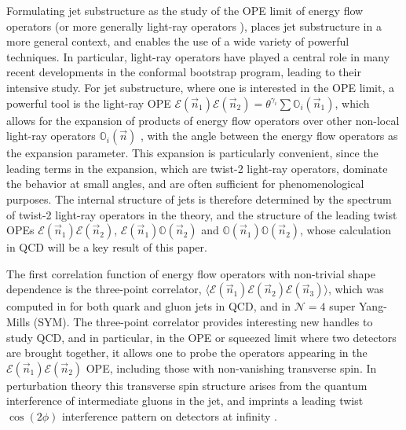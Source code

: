 \documentclass[letterpaper,11pt]{article}
\def\cN{\mathcal{N}}
\begin{document}
Formulating jet substructure as the study of the OPE limit of energy flow operators (or more generally light-ray operators \cite{Kravchuk:2018htv}), places jet substructure in a more general context, and enables the use of a wide variety of powerful techniques. In particular, light-ray operators have played a central role in many recent developments in the conformal bootstrap program, leading to their intensive study. For jet substructure, where one is interested in the OPE limit, a powerful tool is the light-ray OPE \cite{Hofman:2008ar,Kravchuk:2018htv,Kologlu:2019bco,Kologlu:2019mfz,1822249} $\mathcal{E}(\vec n_1) \mathcal{E}(\vec n_2)=\theta^{\gamma_i} \sum\mathbb{O}_i(\vec n_1)$, which allows for the expansion of products of energy flow operators over other non-local light-ray operators $\mathbb{O}_i(\vec n)$ \cite{Balitsky:1987bk,Balitsky:1988fi,Balitsky:1990ck,Braun:2003rp,Hofman:2008ar,Kravchuk:2018htv}, with the angle between the energy flow operators as the expansion parameter. This expansion is particularly convenient, since the leading terms in the expansion, which are twist-2 light-ray operators, dominate the  behavior at small angles, and are often sufficient for phenomenological purposes. The internal structure of jets is therefore determined by the spectrum of twist-2 light-ray operators in the theory, and the structure of the leading twist OPEs $\mathcal{E}(\vec n_1) \mathcal{E}(\vec n_2)$, $\mathcal{E}(\vec n_1) \mathbb{O}(\vec n_2)$ and $\mathbb{O}(\vec n_1)\mathbb{O}(\vec n_2)$, whose calculation in QCD will be a key result of this paper.


The first correlation function of energy flow operators with non-trivial shape dependence is the three-point correlator, $\langle \mathcal{E}(\vec n_1) \mathcal{E}(\vec n_2) \mathcal{E}(\vec n_3) \rangle$, which was computed in \cite{Chen:2019bpb} for both quark and gluon jets in QCD, and in $\cN=4$ super Yang-Mills (SYM). The three-point correlator provides interesting new handles to study QCD, and in particular, in the OPE or squeezed limit where two detectors are brought together,  it allows one to probe the operators appearing in the $ \mathcal{E}(\vec n_1) \mathcal{E}(\vec n_2)$ OPE, including those with non-vanishing transverse spin. In perturbation theory this transverse spin structure arises from the quantum interference of intermediate gluons in the jet, and imprints a leading twist $\cos(2\phi)$ interference pattern on detectors at infinity \cite{Chen:2020adz}.
\end{document}
